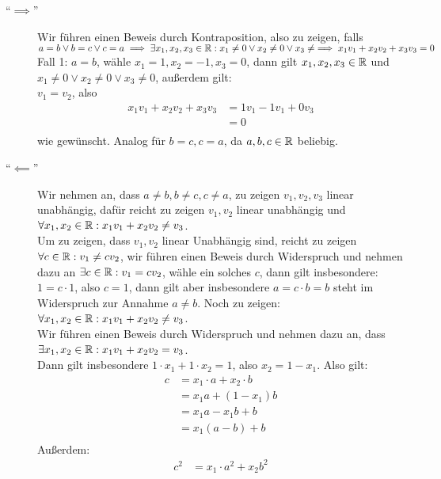 \documentclass{gadsescript}
\begin{document}
\begin{enumerate}[label=(\roman*)]
\begin{proof*}
			\begin{description}
				\item[``$ \implies  $''] Wir führen einen Beweis durch Kontraposition, also zu zeigen, falls $ a=b \vee b = c \vee c = a \implies \exists x_1, x_2, x_3 \in \mathbb{R} : x_1 \neq 0 \vee x_2 \neq 0 \vee x_3 \neq \implies x_1v_1 + x_2v_2 + x_3v_3 = 0$\\
					Fall 1: $ a = b $, wähle $ x_1 = 1, x_2 = -1, x_3 = 0 $, dann gilt $ x_1,x_2,x_3 \in \mathbb{R}  $ und $ x_1 \neq 0 \vee x_2 \neq 0 \vee x_3 \neq 0$, außerdem gilt:\\
					$ v_1 = v_2 $, also 
					\begin{align*}
						x_1v_1 + x_2v_2 + x_3v_3 &= 1v_1 - 1v_1 + 0v_3 \\
						~&= 0 \\
					\end{align*}
					wie gewünscht.
					Analog für $ b = c, c = a $, da $ a,b,c \in \mathbb{R}  $ beliebig.
				\item[``$ \impliedby  $''] Wir nehmen an, dass $ a \neq b, b\neq c, c \neq a $, zu zeigen $ v_1, v_2, v_3 $ linear unabhängig, dafür reicht zu zeigen $ v_1, v_2 $ linear unabhängig und $ \forall x_1, x_2 \in \mathbb{R} : x_1v_1 + x_2v_2 \neq v_3 $.\\
					Um zu zeigen, dass $ v_1, v_2 $ linear Unabhängig sind, reicht zu zeigen $ \forall c \in \mathbb{R} : v_1 \neq cv_2 $,
					wir führen einen Beweis durch Widerspruch und nehmen dazu an $ \exists c \in \mathbb{R} : v_1 = c v_2 $, wähle ein solches $ c $, dann gilt insbesondere: $ 1 = c \cdot 1 $, also $ c = 1 $, dann gilt aber insbesondere $ a = c \cdot b = b $ \Lightning steht im Widerspruch zur Annahme $ a \neq b $.
					Noch zu zeigen: $ \forall x_1, x_2 \in \mathbb{R} : x_1v_1 + x_2v_2 \neq v_3 $.\\
					Wir führen einen Beweis durch Widerspruch und nehmen dazu an, dass $ \exists x_1, x_2 \in \mathbb{R} : x_1v_1 + x_2v_2 = v_3 $.\\
					Dann gilt insbesondere $ 1 \cdot x_1 + 1 \cdot x_2 = 1 $, also $ x_2 = 1 - x_1 $. Also gilt:
					\begin{align*}
						c &= x_1 \cdot a + x_2 \cdot b\\
						~&= x_1 a + (1 - x_1 )b \\
						~&= x_1 a - x_1b + b \\
						~&= x_1 ( a - b) + b \\
					\end{align*}
					Außerdem:
					\begin{align*}
						c^2 &= x_1 \cdot a^2 + x_2 b^2 \\

\end{align*}
\end{description}
\end{proof*}
\end{enumerate}
\end{document}
